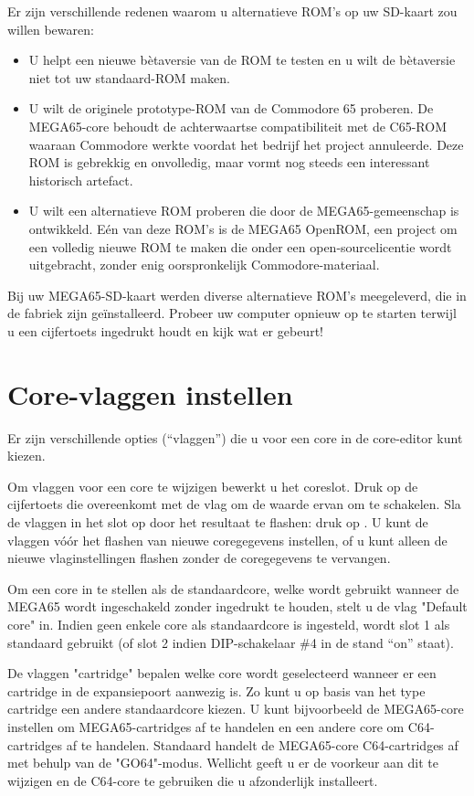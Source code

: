 Er zijn verschillende redenen waarom u alternatieve ROM's op uw SD-kaart zou willen bewaren:

\begin{itemize}
  \item U helpt een nieuwe bètaversie van de ROM te testen en u wilt de bètaversie niet tot uw standaard-ROM maken.
  \item U wilt de originele prototype-ROM van de Commodore 65 proberen. De MEGA65-core behoudt de achterwaartse compatibiliteit met de C65-ROM waaraan Commodore werkte voordat het bedrijf het project annuleerde. Deze ROM is gebrekkig en onvolledig, maar vormt nog steeds een interessant historisch artefact.
  \item U wilt een alternatieve ROM proberen die door de MEGA65-gemeenschap is ontwikkeld. Eén van deze ROM's is de MEGA65 OpenROM, een project om een volledig nieuwe ROM te maken die onder een open-sourcelicentie wordt uitgebracht, zonder enig oorspronkelijk Commodore-materiaal.
\end{itemize}

Bij uw MEGA65-SD-kaart werden diverse alternatieve ROM's meegeleverd, die in de fabriek zijn geïnstalleerd. Probeer uw computer opnieuw op te starten terwijl u een cijfertoets ingedrukt houdt en kijk wat er gebeurt!

\section{Core-vlaggen instellen}

Er zijn verschillende opties (``vlaggen'') die u voor een core in de core-editor kunt kiezen.

Om vlaggen voor een core te wijzigen bewerkt u het coreslot. Druk op de cijfertoets die overeenkomt met de vlag om de waarde ervan om te schakelen. Sla de vlaggen in het slot op door het resultaat te flashen: druk op . U kunt de vlaggen vóór het flashen van nieuwe coregegevens instellen, of u kunt alleen de nieuwe vlaginstellingen flashen zonder de coregegevens te vervangen.

Om een core in te stellen als de standaardcore, welke wordt gebruikt wanneer de MEGA65 wordt ingeschakeld zonder  ingedrukt te houden, stelt u de vlag "Default core" in. Indien geen enkele core als standaardcore is ingesteld, wordt slot 1 als standaard gebruikt (of slot 2 indien DIP-schakelaar \#4 in de stand ``on'' staat).

De vlaggen "cartridge" bepalen welke core wordt geselecteerd wanneer er een cartridge in de expansiepoort aanwezig is. Zo kunt u op basis van het type cartridge een andere standaardcore kiezen. U kunt bijvoorbeeld de MEGA65-core instellen om MEGA65-cartridges af te handelen en een andere core om C64-cartridges af te handelen. Standaard handelt de MEGA65-core C64-cartridges af met behulp van de "GO64"-modus. Wellicht geeft u er de voorkeur aan dit te wijzigen en de C64-core te gebruiken die u afzonderlijk installeert.

